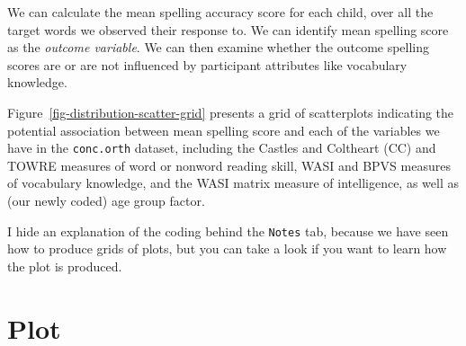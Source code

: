 \documentclass[
  letterpaper,
  DIV=11,
  numbers=noendperiod]{scrreprt}
\begin{document}
We can calculate the mean spelling accuracy score for each child, over
all the target words we observed their response to. We can identify mean
spelling score as the \emph{outcome variable}. We can then examine
whether the outcome spelling scores are or are not influenced by
participant attributes like vocabulary knowledge.

Figure~\ref{fig-distribution-scatter-grid} presents a grid of
scatterplots indicating the potential association between mean spelling
score and each of the variables we have in the \texttt{conc.orth}
dataset, including the Castles and Coltheart (CC) and TOWRE measures of
word or nonword reading skill, WASI and BPVS measures of vocabulary
knowledge, and the WASI matrix measure of intelligence, as well as (our
newly coded) age group factor.

I hide an explanation of the coding behind the \texttt{Notes} tab,
because we have seen how to produce grids of plots, but you can take a
look if you want to learn how the plot is produced.

\section{Plot}
\end{document}
